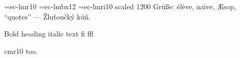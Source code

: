  
\font\lm=ec-lmr10 \font\lmb=ec-lmbx12 \font\lmi=ec-lmri10 scaled 1200
\lm Gr\"u\ss e: \'el\`eve, na\"\i ve, \AE sop, ``quotes'' --- \v Zlu\v tou\v ck\'y k\r u\v n.
\par\lmb Bold heading \lmi italic text fi ffl
\par\tenrm cmr10 too.
\bye
